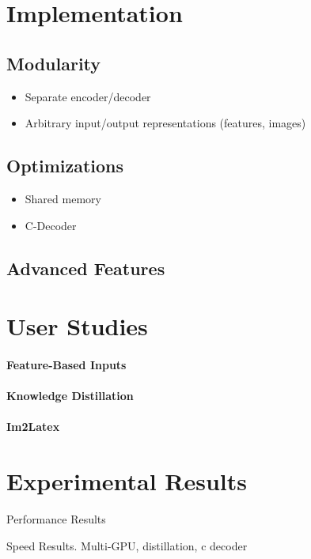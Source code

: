 \documentclass[11pt]{article}
\begin{document}
\section{Implementation}

\subsection{Modularity}

\begin{itemize}
\item Separate encoder/decoder 
\item Arbitrary input/output representations (features, images)
\end{itemize}

\subsection{Optimizations}

\begin{itemize}
\item Shared memory
\item C-Decoder 
\end{itemize}

\subsection{Advanced Features}

\section{User Studies}

\paragraph{Feature-Based Inputs}

\paragraph{Knowledge Distillation}

\paragraph{Im2Latex}

\section{Experimental Results}

\begin{table}
  \centering
  
  \caption{Performance Results}
\end{table}


\begin{table}
  \centering
  
  \caption{Speed Results. Multi-GPU, distillation, c decoder}
\end{table}






\end{document}
